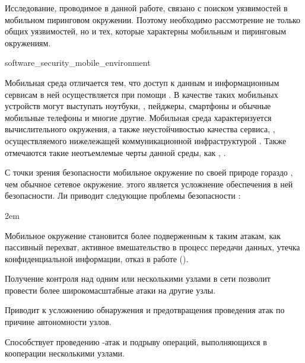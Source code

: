 %
Исследование, проводимое в данной работе, связано с поиском уязвимостей в мобильном пиринговом окружении. 
%
Поэтому необходимо рассмотрение не только общих уязвимостей, но и тех, которые характерны мобильным и пиринговым окружениям. 


	{software_security_mobile_environment}

%
Мобильная среда отличается тем, что доступ к данным и информационным сервисам в ней осуществляется при помощи  . 
%
В качестве таких мобильных устройств могут выступать ноутбуки, , пейджеры, смартфоны и обычные мобильные телефоны и многие другие.
%
Мобильная среда характеризуется  вычислительного окружения, а также неустойчивостью качества сервиса, , осуществляемого нижележащей коммуникационной инфраструктурой . 
%
Также отмечаются такие неотъемлемые черты данной среды, как ,  . 

%
С точки зрения безопасности мобильное окружение по своей природе гораздо , чем обычное сетевое окружение. 
%
 этого является усложнение обеспечения в ней безопасности. 
%
Ли приводит следующие проблемы безопасности : 
\begin{description}
	\leftskip2em%
	\setlength{\itemsep}{0pt}%
	\setlength{\parsep}{0pt}%

	\item[Отсутствие границ безопасности.] Мобильное окружение становится более подверженным к таким атакам, как пассивный перехват, активное вмешательство в процесс передачи данных, утечка конфиденциальной информации, отказ в работе ().

	\item[Угроза со стороны скомпрометированных узлов.] Получение контроля над одним или несколькими узлами в сети позволит провести более широкомасштабные атаки на другие узлы. 

	\item[Отсутствие централизованного средства управления.] Приводит к усложнению обнаружения и предотвращения проведения атак по причине автономности узлов.

	\item[Ограниченное электропитание.] Способствует проведению -атак и подрыву операций, выполняющихся в кооперации несколькими узлами. 
\end{description}

